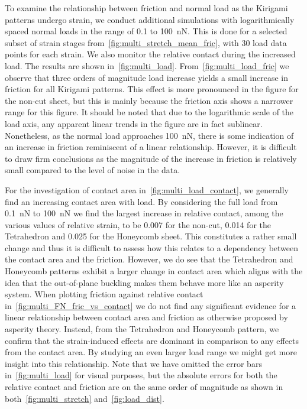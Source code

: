 To examine the relationship between friction and normal load as the Kirigami
patterns undergo strain, we conduct additional simulations with logarithmically spaced normal loads in the range of 0.1 to \SI{100}{nN}. This
is done for a selected subset of strain stages
from~\cref{fig:multi_stretch_mean_fric}, with 30 load data points for each
strain. We also monitor the relative contact during the increased load. The
results are shown in~\cref{fig:multi_load}. From~\cref{fig:multi_load_fric} we observe that three orders of magnitude load increase yields a small increase in friction for all Kirigami patterns. This effect
is more pronounced in the figure for the non-cut sheet, but this is mainly because the friction axis shows a narrower range for this figure. It
should be noted that due to the logarithmic scale of the load axis, any apparent
linear trends in the figure are in fact sublinear. Nonetheless, as the normal load
approaches \SI{100}{nN}, there is some indication of an increase in friction
reminiscent of a linear relationship. However, it is difficult to draw firm
conclusions as the magnitude of the increase in friction is relatively small
compared to the level of noise in the data. 

For the investigation of contact area in~\cref{fig:multi_load_contact}, we generally find an increasing contact area with load. By
considering the full load from \SI{0.1}{nN} to \SI{100}{nN} we find the largest increase in relative contact, among the various values of relative strain, to be 0.007 for the non-cut, 0.014 for the Tetrahedron and 0.025 for the Honeycomb
sheet. This constitutes a rather small change and thus it is difficult to assess
how this relates to a dependency between the contact area and the friction.
However, we do see that the Tetrahedron and Honeycomb patterns exhibit a larger
change in contact area which aligns with the idea that the out-of-plane buckling makes them
behave more like an asperity system. When plotting friction against relative contact in~\cref{fig:multi_FN_fric_vs_contact} we do not find any significant evidence for a linear relationship between contact area and friction as otherwise proposed by asperity theory. Instead, from the Tetrahedron and Honeycomb pattern, we confirm that the strain-induced effects are dominant in comparison to any effects from the contact area. By studying an even larger load range we might
get more insight into this relationship. Note that we have omitted the error bars in~\cref{fig:multi_load} for visual purposes, but the absolute errors for both the relative contact and friction are on the same order of magnitude as shown in both~\cref{fig:multi_stretch} and~\cref{fig:load_dist}.

